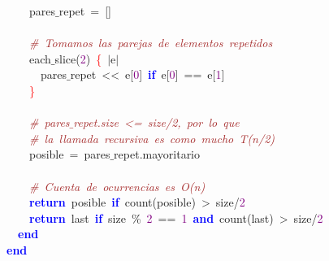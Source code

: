 \mbox{}\ \ \ \ pares$\_$repet\ \textcolor{BrickRed}{=}\ \textcolor{BrickRed}{[]} \\
\mbox{} \\
\mbox{}\ \ \ \ \textit{\textcolor{Brown}{\#\ Tomamos\ las\ parejas\ de\ elementos\ repetidos}} \\
\mbox{}\ \ \ \ each$\_$slice\textcolor{BrickRed}{(}\textcolor{Purple}{2}\textcolor{BrickRed}{)}\ \textcolor{Red}{\{}\ \textcolor{BrickRed}{$|$}e\textcolor{BrickRed}{$|$} \\
\mbox{}\ \ \ \ \ \ pares$\_$repet\ \textcolor{BrickRed}{\textless{}\textless{}}\ e\textcolor{BrickRed}{[}\textcolor{Purple}{0}\textcolor{BrickRed}{]}\ \textbf{\textcolor{Blue}{if}}\ e\textcolor{BrickRed}{[}\textcolor{Purple}{0}\textcolor{BrickRed}{]}\ \textcolor{BrickRed}{==}\ e\textcolor{BrickRed}{[}\textcolor{Purple}{1}\textcolor{BrickRed}{]} \\
\mbox{}\ \ \ \ \textcolor{Red}{\}} \\
\mbox{} \\
\mbox{}\ \ \ \ \textit{\textcolor{Brown}{\#\ pares$\_$repet.size\ \textless{}=\ size/2,\ por\ lo\ que}} \\
\mbox{}\ \ \ \ \textit{\textcolor{Brown}{\#\ la\ llamada\ recursiva\ es\ como\ mucho\ T(n/2)}} \\
\mbox{}\ \ \ \ posible\ \textcolor{BrickRed}{=}\ pares$\_$repet\textcolor{BrickRed}{.}mayoritario \\
\mbox{} \\
\mbox{}\ \ \ \ \textit{\textcolor{Brown}{\#\ Cuenta\ de\ ocurrencias\ es\ O(n)}} \\
\mbox{}\ \ \ \ \textbf{\textcolor{Blue}{return}}\ posible\ \textbf{\textcolor{Blue}{if}}\ count\textcolor{BrickRed}{(}posible\textcolor{BrickRed}{)}\ \textcolor{BrickRed}{\textgreater{}}\ size\textcolor{BrickRed}{/}\textcolor{Purple}{2} \\
\mbox{}\ \ \ \ \textbf{\textcolor{Blue}{return}}\ last\ \textbf{\textcolor{Blue}{if}}\ size\ \textcolor{BrickRed}{\%}\ \textcolor{Purple}{2}\ \textcolor{BrickRed}{==}\ \textcolor{Purple}{1}\ \textbf{\textcolor{Blue}{and}}\ count\textcolor{BrickRed}{(}last\textcolor{BrickRed}{)}\ \textcolor{BrickRed}{\textgreater{}}\ size\textcolor{BrickRed}{/}\textcolor{Purple}{2} \\
\mbox{}\ \ \textbf{\textcolor{Blue}{end}} \\
\mbox{}\textbf{\textcolor{Blue}{end}} \\
\mbox{} \\
\mbox{} \\
